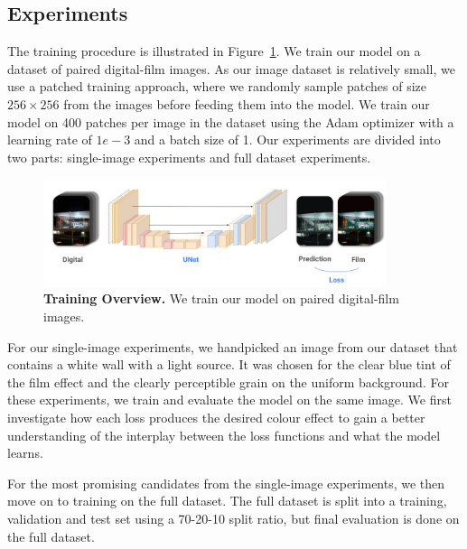 \subsection{Experiments}
\label{subsec:experiments}

The training procedure is illustrated in Figure~\ref{fig:training-overview}. We train our model on a dataset of paired digital-film images. As our image dataset is relatively small, we use a patched training approach, where we randomly sample patches of size $256 \times 256$ from the images before feeding them into the model. We train our model on 400 patches per image in the dataset using the Adam optimizer with a learning rate of $1e-3$ and a batch size of 1. Our experiments are divided into two parts: single-image experiments and full dataset experiments.

\begin{figure}
  \centering
  \includegraphics[width=0.9\textwidth]{figures/training-overview.png}
  \caption{\textbf{Training Overview.} We train our model on paired digital-film images.}
  \label{fig:training-overview}
\end{figure}

For our single-image experiments, we handpicked an image from our dataset that contains a white wall with a light source. It was chosen for the clear blue tint of the film effect and the clearly perceptible grain on the uniform background. For these experiments, we train and evaluate the model on the same image. We first investigate how each loss produces the desired colour effect to gain a better understanding of the interplay between the loss functions and what the model learns.

For the most promising candidates from the single-image experiments, we then
move on to training on the full dataset. The full dataset is split into a
training, validation and test set using a 70-20-10 split ratio, but final evaluation is done on the full dataset.

